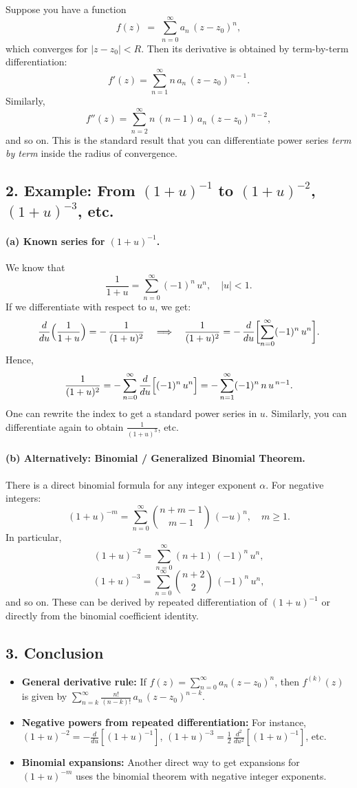 \documentclass[12pt]{article}
\theoremstyle{definition} %
\theoremstyle{plain} %
\begin{document}
Suppose you have a function
\[
f(z) \;=\;\sum_{n=0}^\infty a_n\,(z - z_0)^n,
\]
which converges for \(|z-z_0|<R\). Then its derivative is obtained by term-by-term differentiation:
\[
f'(z) 
= \sum_{n=1}^\infty n\,a_n\,(z - z_0)^{\,n-1}.
\]
Similarly,
\[
f''(z) 
= \sum_{n=2}^\infty n\,(n-1)\,a_n\,(z - z_0)^{\,n-2},
\]
and so on.  This is the standard result that you can differentiate power series \emph{term by term} inside the radius of convergence.

\subsection*{2. Example: From \((1+u)^{-1}\) to \((1+u)^{-2}\), \((1+u)^{-3}\), etc.}

\paragraph{(a) Known series for \((1+u)^{-1}\).}
We know that
\[
\frac{1}{1+u}
= \sum_{n=0}^\infty (-1)^n\,u^n,
\quad |u|<1.
\]
If we differentiate with respect to \(u\), we get:
\[
\frac{d}{du}\Bigl(\frac{1}{1+u}\Bigr)
= -\,\frac{1}{(1+u)^2}
\quad\Longrightarrow\quad
\frac{1}{(1+u)^2}
= -\,\frac{d}{du}\biggl[\sum_{n=0}^\infty (-1)^n\,u^n\biggr].
\]
Hence,
\[
\frac{1}{(1+u)^2}
= -\sum_{n=0}^\infty \frac{d}{du}\Bigl[(-1)^n\,u^n\Bigr]
= -\sum_{n=1}^\infty (-1)^n\,n\,u^{\,n-1}.
\]
One can rewrite the index to get a standard power series in \(u\). Similarly, you can differentiate again to obtain \(\frac{1}{(1+u)^3}\), etc.

\paragraph{(b) Alternatively: Binomial / Generalized Binomial Theorem.}
There is a direct binomial formula for any integer exponent \(\alpha\). For negative integers:
\[
(1+u)^{-m}
= \sum_{n=0}^\infty \binom{n+m-1}{m-1}\,(-u)^n,
\quad m\ge1.
\]
In particular, 
\[
(1+u)^{-2}
= \sum_{n=0}^\infty (n+1)\,(-1)^n\,u^n,
\]
\[
(1+u)^{-3}
= \sum_{n=0}^\infty \binom{n+2}{2}\,(-1)^n\,u^n,
\]
and so on. These can be derived by repeated differentiation of \((1+u)^{-1}\) or directly from the binomial coefficient identity.

\subsection*{3. Conclusion}

\begin{itemize}
  \item \textbf{General derivative rule:} If $f(z) = \sum_{n=0}^\infty a_n (z-z_0)^n$, then $f^{(k)}(z)$ is given by $\sum_{n=k}^\infty \frac{n!}{(n-k)!}\,a_n\,(z-z_0)^{n-k}$. 
  \item \textbf{Negative powers from repeated differentiation:} For instance, $(1+u)^{-2} = -\frac{d}{du}[(1+u)^{-1}]$, $(1+u)^{-3} = \tfrac12\,\frac{d^2}{du^2}[(1+u)^{-1}]$, etc. 
  \item \textbf{Binomial expansions:} Another direct way to get expansions for \((1+u)^{-m}\) uses the binomial theorem with negative integer exponents.
\end{itemize}
\end{document}
